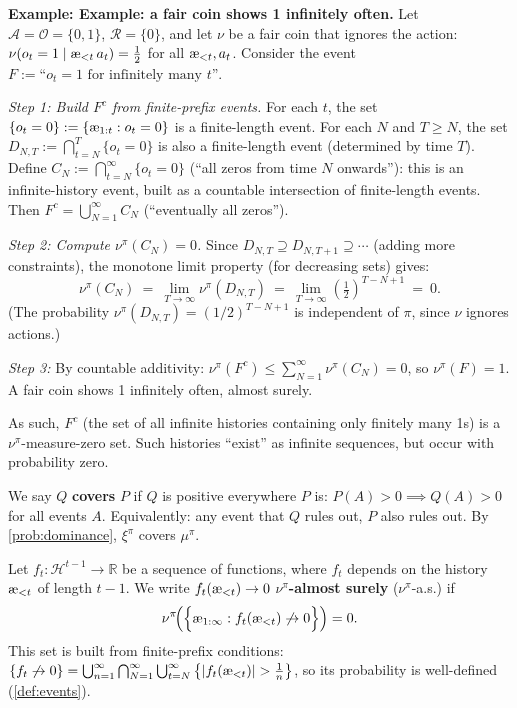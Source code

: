 \documentclass[fontsize=11pt, parskip=half]{scrartcl}
\newcommand{\cA}{\mathcal{A}}
\newcommand{\cO}{\mathcal{O}}
\newcommand{\cR}{\mathcal{R}}
\newcommand{\cH}{\mathcal{H}}
\newcommand{\aes}{\textnormal{\ae}}
\begin{document}
\begin{callout}[tip]
\textbf{Example: Example: a fair coin shows 1 infinitely often.}
Let $\cA = \cO = \{0,1\}$, $\cR = \{0\}$, and let $\nu$ be a fair coin that ignores the action: $\nu(o_t = 1 \mid \aes_{<t}\, a_t) = \tfrac{1}{2}$ for all $\aes_{<t}, a_t$.
Consider the event $F := \text{``}o_t = 1\text{ for infinitely many } t\text{''}$.

\medskip
\emph{Step 1: Build $F^c$ from finite-prefix events.}
For each $t$, the set $\{o_t = 0\} := \{\aes_{1:t} : o_t = 0\}$ is a finite-length event.
For each $N$ and $T \geq N$, the set $D_{N,T} := \bigcap_{t=N}^{T} \{o_t = 0\}$ is also a finite-length event (determined by time $T$).
Define $C_N := \bigcap_{t=N}^{\infty} \{o_t = 0\}$ (``all zeros from time $N$ onwards''): this is an infinite-history event, built as a countable intersection of finite-length events.
Then $F^c = \bigcup_{N=1}^\infty C_N$ (``eventually all zeros'').

\medskip
\emph{Step 2: Compute $\nu^\pi(C_N) = 0$.}
Since $D_{N,T} \supseteq D_{N,T+1} \supseteq \cdots$ (adding more constraints), the monotone limit property (for decreasing sets) gives:
\[
    \nu^\pi(C_N)
    ~=~ \lim_{T \to \infty} \nu^\pi(D_{N,T})
    ~=~ \lim_{T \to \infty} \left(\tfrac{1}{2}\right)^{T - N + 1}
    ~=~ 0.
\]
(The probability $\nu^\pi(D_{N,T}) = (1/2)^{T-N+1}$ is independent of $\pi$, since $\nu$ ignores actions.)

\medskip
\emph{Step 3:}
By countable additivity: $\nu^\pi(F^c) \leq \sum_{N=1}^\infty \nu^\pi(C_N) = 0$, so $\nu^\pi(F) = 1$.
A fair coin shows 1 infinitely often, almost surely.

As such, $F^c$ (the set of all infinite histories containing only finitely many 1s) is a $\nu^\pi$-measure-zero set. Such histories ``exist'' as infinite sequences, but occur with probability zero.
\end{callout}

\begin{definition}\label{def:covering}
We say $Q$ \textbf{covers} $P$ if $Q$ is positive everywhere $P$ is:
$P(A) > 0 \implies Q(A) > 0$ for all events $A$.
Equivalently: any event that $Q$ rules out, $P$ also rules out.
By \cref{prob:dominance}, $\xi^\pi$ covers $\mu^\pi$.
\end{definition}

\begin{definition}\label{def:as}
Let $f_t : \cH^{t-1} \to \mathbb{R}$ be a sequence of functions, where $f_t$ depends on the history $\aes_{<t}$ of length $t-1$. We write $f_t(\aes_{<t}) \to 0$ $\nu^\pi$\textbf{-almost surely} ($\nu^\pi$-a.s.) if
\[
    \nu^\pi\!\Big(\Big\{\aes_{1:\infty} : f_t(\aes_{<t}) \not\to 0\Big\}\Big) = 0.
\]
This set is built from finite-prefix conditions:
$\{f_t \not\to 0\} = \bigcup_{n=1}^\infty \bigcap_{N=1}^\infty \bigcup_{t=N}^\infty \big\{|f_t(\aes_{<t})| > \tfrac{1}{n}\big\}$,
so its probability is well-defined (\cref{def:events}).
\end{definition}
\end{document}
